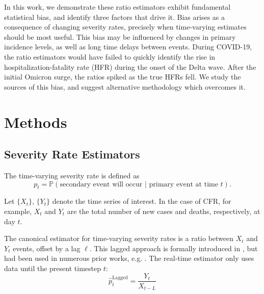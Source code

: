 \documentclass{article}
\begin{document}
In this work, we demonstrate these ratio estimators exhibit fundamental statistical bias, and identify three factors that drive it. Bias arises as a consequence of changing severity rates, precisely when time-varying estimates should be most useful. This bias may be influenced by changes in primary incidence levels, as well as long time delays between events. During COVID-19, the ratio estimators would have failed to quickly identify the rise in hospitalization-fatality rate (HFR) during the onset of the Delta wave. After the initial Omicron surge, the ratios spiked as the true HFRs fell. We study the sources of this bias, and suggest alternative methodology which overcomes it.


\section{Methods}
\subsection{Severity Rate Estimators}

The time-varying severity rate is defined as
\begin{equation}\label{eq:severity}
    p_t = \mathbb{P}(\text{secondary event will occur } \vert \text{ primary event at time }t).
\end{equation}

Let $\{X_t\}$, $\{Y_t\}$ denote the time series of interest. In the case of CFR, for example, $X_t$ and $Y_t$ are the total number of new cases and deaths, respectively, at day $t$. 

The canonical estimator for time-varying severity rates is a ratio between $X_t$ and $Y_t$ events, offset by a lag $\ell$. This lagged approach is formally introduced in \citeauthor{thomas2021estimating}, but had been used in numerous prior works, e.g. \cite{germany,horita2022global,timevar_ifr,yuan2020monitoring,LIU2023100350,atlantic,wsj}. The real-time estimator only uses data until the present timestep $t$: 
\begin{equation}\label{eq:lagged}
    \hat{p}_t^{\text{Lagged}} = \frac{Y_t}{X_{t-L}}
\end{equation}
\end{document}

